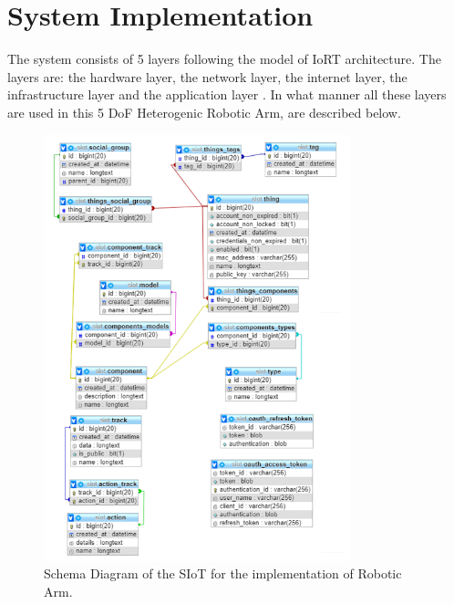 \documentclass[conference]{IEEEtran}
\begin{document}
\section{System Implementation}

The system consists of 5 layers following the model of IoRT architecture. The layers are: the hardware layer, the network layer, the internet layer, the infrastructure layer and the application layer \cite{nine}.  In what manner all these layers are used in this 5 DoF Heterogenic Robotic Arm, are described below. 

\begin{figure}[ht!] %
 \centering
 \includegraphics[width=3.5in]{Picture1.png}
 \caption{Schema Diagram of the SIoT for the implementation of Robotic Arm.}
 \label{schema}
 \end{figure}
 
\end{document}
